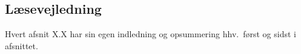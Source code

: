 \subsection{Læsevejledning}

Hvert afsnit X.X har sin egen indledning og opsummering hhv.\ først og sidst i afsnittet.




